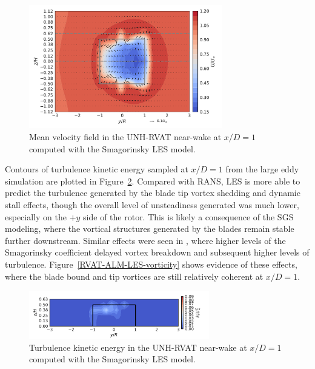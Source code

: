 \documentclass[times]{weauth}
\begin{document}
\begin{figure}
    \centering

    \includegraphics[width=0.75\textwidth]{RVAT-ALM-LES_meancontquiv}

    \caption{Mean velocity field in the UNH-RVAT near-wake at $x/D=1$ computed
        with the Smagorinsky LES model.}

    \label{fig:RVAT-ALM-LES-meancontquiv}
\end{figure}

Contours of turbulence kinetic energy sampled at $x/D=1$ from the large eddy
simulation are plotted in Figure~\ref{fig:RVAT-ALM-LES-kcont}. Compared with
RANS, LES is more able to predict the turbulence generated by the blade tip
vortex shedding and dynamic stall effects, though the overall level of
unsteadiness generated was much lower, especially on the $+y$ side of the rotor.
This is likely a consequence of the SGS modeling, where the vortical structures
generated by the blades remain stable further downstream. Similar effects were
seen in \cite{Martinez-Tossas2015a, Shamsoddin2014}, where higher levels of the
Smagorinsky coefficient delayed vortex breakdown and subsequent higher levels of
turbulence. Figure~\ref{RVAT-ALM-LES-vorticity} shows evidence of these effects,
where the blade bound and tip vortices are still relatively coherent at $x/D=1$.

\begin{figure}
    \centering

    \includegraphics[width=0.7\textwidth]{RVAT-ALM-LES_kcont}

    \caption{Turbulence kinetic energy in the UNH-RVAT near-wake at $x/D=1$
        computed with the Smagorinsky LES model.}

    \label{fig:RVAT-ALM-LES-kcont}
\end{figure}
\end{document}

